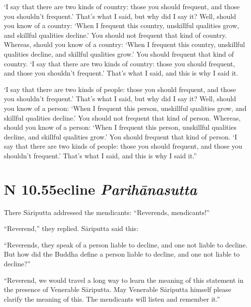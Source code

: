 \documentclass[12pt,openany]{book}%
\newcommand*{\suttatitleacronym}[1]{\smaller[2]{#1}\vspace*{.3em}}
\newcommand*{\suttatitletranslation}[1]{\linebreak{#1}}
\newcommand*{\suttatitleroot}[1]{\linebreak\smaller[2]\itshape{#1}}
\newcommand*{\tocacronym}[1]{\hspace*{-3.3em}{#1}\quad}
\newcommand*{\toctranslation}[1]{#1}
\newcommand*{\tocroot}[1]{(\textit{#1})}
\begin{document}
‘I say that there are two kinds of country: those you should frequent, and those you shouldn’t frequent.’ That’s what I said, but why did I say it? Well, should you know of a country: ‘When I frequent this country, unskillful qualities grow, and skillful qualities decline.’ You should not frequent that kind of country. Whereas, should you know of a country: ‘When I frequent this country, unskillful qualities decline, and skillful qualities grow.’ You should frequent that kind of country. ‘I say that there are two kinds of country: those you should frequent, and those you shouldn’t frequent.’ That’s what I said, and this is why I said it. 

‘I say that there are two kinds of people: those you should frequent, and those you shouldn’t frequent.’ That’s what I said, but why did I say it? Well, should you know of a person: ‘When I frequent this person, unskillful qualities grow, and skillful qualities decline.’ You should not frequent that kind of person. Whereas, should you know of a person: ‘When I frequent this person, unskillful qualities decline, and skillful qualities grow.’ You should frequent that kind of person. ‘I say that there are two kinds of people: those you should frequent, and those you shouldn’t frequent.’ That’s what I said, and this is why I said it.” 

%
\section*{{\suttatitleacronym AN 10.55}{\suttatitletranslation Decline }{\suttatitleroot Parihānasutta}}
\addcontentsline{toc}{section}{\tocacronym{AN 10.55} \toctranslation{Decline } \tocroot{Parihānasutta}}

There \textsanskrit{Sāriputta} addressed the mendicants: “Reverends, mendicants!” 

“Reverend,” they replied. \textsanskrit{Sāriputta} said this: 

“Reverends, they speak of a person liable to decline, and one not liable to decline. But how did the Buddha define a person liable to decline, and one not liable to decline?” 

“Reverend, we would travel a long way to learn the meaning of this statement in the presence of Venerable \textsanskrit{Sāriputta}. May Venerable \textsanskrit{Sāriputta} himself please clarify the meaning of this. The mendicants will listen and remember it.” 
\end{document}
